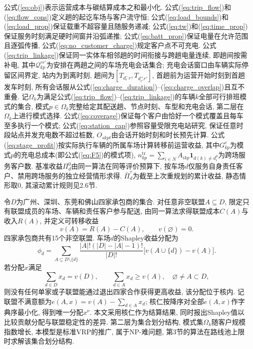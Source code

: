 \documentclass{setp-new}
\begin{document}
公式(\ref{eq:obj})表示运营成本与碳结算成本之和最小化.
公式(\ref{eq:trip_flow})和(\ref{eq:flow_cons})定义趟的起讫车场与客户流守恒;
公式(\ref{eq:load_bounds})和(\ref{eq:load_prop})保证载重不超容量且随服务递减;
公式(\ref{eq:tw})和(\ref{eq:time_prop})保证服务时刻满足硬时间窗并沿弧递推;
公式(\ref{eq:batt_prop})保证电量在允许范围且逐弧传播, 公式(\ref{eq:no_customer_charge})规定客户点不可充电.
公式(\ref{eq:trip_linkage})保证同一实体车相邻趟的时间衔接与跨趟电量连续, 即趟间按需补电,
其中$\mathcal Q_{kp}^{rr'}$为安排在两趟之间的车场充电会话集合;
充电会话窗口由车辆实际停留区间界定, 站内为到离时刻, 趟间为$[T_{d_r^-r},T_{d_{r'}^+r'}]$,
首趟前为运营开始时刻到首趟发车时刻, 所有会话服从公式(\ref{eq:charge_duration})--(\ref{eq:charge_overlap})且互不重叠.
记$\Omega_k$为满足公式(\ref{eq:trip_flow})--(\ref{eq:trip_linkage})的车辆$k$全部可行排班模式的集合,
模式$p\in\Omega_k$完整给定其配送趟、节点时刻、车型和充电会话, 第二层在$\Omega_k$上进行模式选择.
公式(\ref{eq:coverage})保证每个客户由恰好一个模式覆盖且每车至多执行一个模式;
公式(\ref{eq:station_cap})参照容量受限充电站研究\cite{ref:12,ref:13},
保证任意时段站点并发充电数不超过桩数, $O_{skpt}$由会话开始时刻和时长预先计算.
公式(\ref{eq:stage_profit})按实际执行车辆的所属车场计算转移前运营收益,
其中$G_{kp}^{e}$为模式$p$的充电总成本(即公式(\ref{eq:F5})的模式项),
$n_{kp}^{\mathrm{tr}}=\sum_{i\in N}A_{ikp}\mathbf 1_{d(k)\neq d_i^0}$为跨场服务客户数.
基准收益$\Pi_d^0$由同一算法在同等评价预算下,
按车场$d$仅服务自身责任客户、禁用跨场服务的独立经营情形求得.
$\bar\Pi_d^\tau$为截至上次重规划的累计收益, 静态情形取0, 其滚动累计规则见2.6节.

令$D$为广州、深圳、东莞和佛山四家承包商的集合.
对任意非空联盟$A\subseteq D$, 限定只有联盟成员的车场、车辆和责任客户参与配送,
由同一算法求得联盟成本$C(A)$与收入$R(A)$, 并定义可转移收益
\begin{equation}
v(A)=R(A)-C(A),\qquad v(\varnothing)=0.
\label{eq:coalition_profit}
\end{equation}
四家承包商共有15个非空联盟. 车场$d$的Shapley收益分配为
\begin{equation}
\phi_d=\sum_{A\subseteq D\setminus\{d\}}
\frac{|A|!(|D|-|A|-1)!}{|D|!}
\bigl[v(A\cup\{d\})-v(A)\bigr].
\label{eq:shapley}
\end{equation}
若分配$x$满足
\begin{equation}
\sum_{d\in D}x_d=v(D),\qquad
\sum_{d\in A}x_d\ge v(A),\quad \varnothing\ne A\subset D,
\label{eq:core}
\end{equation}
则没有任何单家或子联盟能通过退出四家合作获得更高收益, 该分配位于核内.
记联盟不满意额为$e(A,x)=v(A)-\sum_{d\in A}x_d$;
核仁按降序对全部$e(A,x)$作字典序最小化, 得到唯一分配$x^{\nu}$.
本文采用核仁作为结算结果, 同时报出Shapley值以比较贡献分配与联盟稳定性的差异.
第二层为集合划分结构, 模式集$\Omega_k$随客户规模指数增长,
本模型是标准VRP的推广, 属于NP-难问题, 第3节的算法在路线池上限时求解该集合划分结构.
\end{document}
